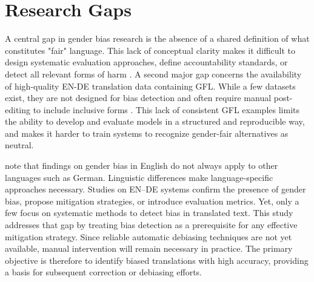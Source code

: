 
    \section{Research Gaps}
    A central gap in gender bias research is the absence of a shared definition of what constitutes "fair" language. This lack of conceptual clarity makes it difficult to design systematic evaluation approaches, define accountability standards, or detect all relevant forms of harm \parencite{barclayInvestigatingMarkersDrivers2024a,shresthaExploringGenderBiases2022,stanczakSurveyGenderBias2021}. A second major gap concerns the availability of high-quality EN-DE translation data containing GFL. While a few datasets exist, they are not designed for bias detection and often require manual post-editing to include inclusive forms \parencite{lardelliBuildingBridgesDataset2024}. This lack of consistent GFL examples limits the ability to develop and evaluate models in a structured and reproducible way, and makes it harder to train systems to recognize gender-fair alternatives as neutral.

    \textcite{stanczakSurveyGenderBias2021} note that findings on gender bias in English do not always apply to other languages such as German. Linguistic differences make language-specific approaches necessary. Studies on EN–DE systems \parencite{ullmannGenderBiasMachine2022,kapplAreAllSpanish2025,lardelliBuildingBridgesDataset2024} confirm the presence of gender bias, propose mitigation strategies, or introduce evaluation metrics. Yet, only a few focus on systematic methods to detect bias in translated text. This study addresses that gap by treating bias detection as a prerequisite for any effective mitigation strategy. Since reliable automatic debiasing techniques are not yet available, manual intervention will remain necessary in practice. The primary objective is therefore to identify biased translations with high accuracy, providing a basis for subsequent correction or debiasing efforts.


